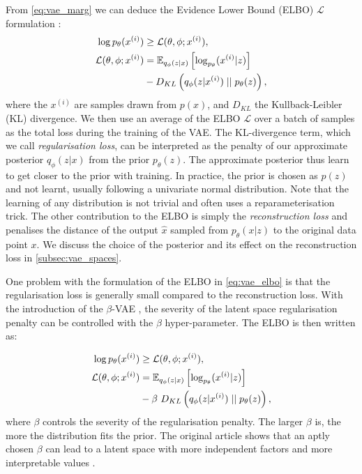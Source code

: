 \documentclass{article}
\begin{document}
From \ref{eq:vae_marg} we can deduce the
Evidence Lower Bound (ELBO) $\mathcal{L}$ formulation \cite{kingmaAutoEncodingVariationalBayes2014a}:
\begin{equation}
    \centering
    \begin{aligned}
    \log p_\theta(x^{(i)}) & \geq \mathcal{L}(\theta, \phi; x^{(i)}),
    \\
    \mathcal{L}(\theta, \phi; x^{(i)}) &=            
    \mathbb{E}_{q_\phi(z|x)}\left [\log_{p_\theta}(x^{(i)}|z) \right]
        \\
        & - D_{KL}\left( q_\phi(z|x^{(i)}) \; || \; p_\theta(z)\right),
    \label{eq:vae_elbo}
    \end{aligned}
\end{equation}
where the $x^{(i)}$ are samples drawn from $p(x)$, and $D_{KL}$ the Kullback-Leibler (KL) divergence.
We then use an average of the ELBO $\mathcal{L}$ over a batch of samples as the total loss during the training of the VAE.
The KL-divergence term, which we call \emph{regularisation loss},
can be interpreted as the penalty of our approximate posterior $q_\phi(z|x)$ from the prior $p_\theta(z)$.
The approximate posterior thus learn to get closer to the prior with training.
In practice, the prior is chosen as $p(z)$ and not learnt, usually following a univariate normal distribution.
Note that the learning of any distribution is not trivial
and often uses a reparameterisation trick.
The other contribution to the ELBO is simply the \emph{reconstruction loss}
and penalises the distance of the output $\hat{x}$ sampled from $p_\theta(x|z)$ to the original data point $x$.
We discuss the choice of the posterior and its effect on the reconstruction loss in \ref{subsec:vae_spaces}.

One problem with the formulation of the ELBO in \ref{eq:vae_elbo}
is that the regularisation loss is generally small compared to the reconstruction loss.
With the introduction of the $\beta$-VAE \cite{higginsBetaVAELearningBasic2017},
the severity of the latent space regularisation penalty can be controlled with the $\beta$ hyper-parameter. The ELBO is then written as:

\begin{equation}
    \centering
    \begin{aligned}
    \log p_\theta(x^{(i)}) & \geq \mathcal{L}(\theta, \phi; x^{(i)}),
    \\
    \mathcal{L}(\theta, \phi; x^{(i)}) &=            
    \mathbb{E}_{q_\phi(z|x)}\left [\log_{p_\theta}(x^{(i)}|z) \right]
        \\
        & - \beta ~ D_{KL}\left( q_\phi(z|x^{(i)}) \; || \; p_\theta(z)\right),
    \label{eq:betavae_elbo}
    \end{aligned}
\end{equation}
where $\beta$ controls the severity of the regularisation penalty.
The larger $\beta$ is, the more the distribution fits the prior.
The original article shows that an aptly chosen $\beta$ can lead to a latent space 
with more independent factors and more interpretable values \cite{higginsBetaVAELearningBasic2017}.
\end{document}
